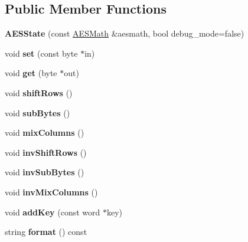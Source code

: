 \subsection*{Public Member Functions}
\begin{DoxyCompactItemize}
\item 
\mbox{\label{classAESState_a2cc9414a52e4f828dce31db66af44f12}} 
{\bfseries A\+E\+S\+State} (const \hyperlink{classAESMath}{A\+E\+S\+Math} \&aesmath, bool debug\+\_\+mode=false)
\item 
\mbox{\label{classAESState_a289634d47fcbde24b1464c8b82ee04f5}} 
void {\bfseries set} (const byte $\ast$in)
\item 
\mbox{\label{classAESState_a374f83c433060db458a586923b2aa116}} 
void {\bfseries get} (byte $\ast$out)
\item 
\mbox{\label{classAESState_aed74abc14779f7d8fcbfea6f06649640}} 
void {\bfseries shift\+Rows} ()
\item 
\mbox{\label{classAESState_ab18b4607210ae88bd825e7b9ca4529a6}} 
void {\bfseries sub\+Bytes} ()
\item 
\mbox{\label{classAESState_a88494d311817ef8ac87984fdc475b138}} 
void {\bfseries mix\+Columns} ()
\item 
\mbox{\label{classAESState_a08dcc6810da02059f3dea7ef0ad50a8e}} 
void {\bfseries inv\+Shift\+Rows} ()
\item 
\mbox{\label{classAESState_abfa9f233a7776649ac044d581f88f240}} 
void {\bfseries inv\+Sub\+Bytes} ()
\item 
\mbox{\label{classAESState_a5a16a03a1569836f8876d9822e8d3874}} 
void {\bfseries inv\+Mix\+Columns} ()
\item 
\mbox{\label{classAESState_abdd8d914886e56653c5a78d3605abf1d}} 
void {\bfseries add\+Key} (const word $\ast$key)
\item 
\mbox{\label{classAESState_a968bcb473d9dfb281f9d753d621792c9}} 
string {\bfseries format} () const
\end{DoxyCompactItemize}
